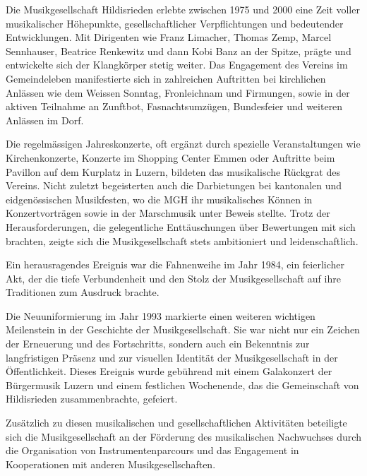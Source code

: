 \begin{history}

    Die Musikgesellschaft Hildisrieden erlebte zwischen 1975 und 2000 eine Zeit
    voller musikalischer Höhepunkte, gesellschaftlicher Verpflichtungen und
    bedeutender Entwicklungen. Mit Dirigenten wie Franz Limacher, Thomas Zemp,
    Marcel Sennhauser, Beatrice Renkewitz und dann Kobi Banz an der Spitze,
    prägte und entwickelte sich der Klangkörper stetig weiter. Das Engagement
    des Vereins im Gemeindeleben manifestierte sich in zahlreichen Auftritten
    bei kirchlichen Anlässen wie dem Weissen Sonntag, Fronleichnam und
    Firmungen, sowie in der aktiven Teilnahme an Zunftbot, Fasnachtsumzügen,
    Bundesfeier und weiteren Anlässen im Dorf.

    Die regelmässigen Jahreskonzerte, oft ergänzt durch spezielle
    Veranstaltungen wie Kirchenkonzerte, Konzerte im Shopping Center Emmen oder
    Auftritte beim Pavillon auf dem Kurplatz in Luzern, bildeten das
    musikalische Rückgrat des Vereins. Nicht zuletzt begeisterten auch die
    Darbietungen bei kantonalen und eidgenössischen Musikfesten, wo die MGH ihr
    musikalisches Können in Konzertvorträgen sowie in der Marschmusik unter
    Beweis stellte. Trotz der Herausforderungen, die gelegentliche
    Enttäuschungen über Bewertungen mit sich brachten, zeigte sich die
    Musikgesellschaft stets ambitioniert und leidenschaftlich.

    Ein herausragendes Ereignis war die Fahnenweihe im Jahr 1984, ein
    feierlicher Akt, der die tiefe Verbundenheit und den Stolz der
    Musikgesellschaft auf ihre Traditionen zum Ausdruck brachte.

    Die Neuuniformierung im Jahr 1993 markierte einen weiteren wichtigen
    Meilenstein in der Geschichte der Musikgesellschaft. Sie war nicht nur ein
    Zeichen der Erneuerung und des Fortschritts, sondern auch ein Bekenntnis zur
    langfristigen Präsenz und zur visuellen Identität der Musikgesellschaft in
    der Öffentlichkeit. Dieses Ereignis wurde gebührend mit einem Galakonzert
    der Bürgermusik Luzern und einem festlichen Wochenende, das die Gemeinschaft
    von Hildisrieden zusammenbrachte, gefeiert.

    Zusätzlich zu diesen musikalischen und gesellschaftlichen Aktivitäten
    beteiligte sich die Musikgesellschaft an der Förderung des musikalischen
    Nachwuchses durch die Organisation von Instrumentenparcours und das
    Engagement in Kooperationen mit anderen Musikgesellschaften.


\end{history}
